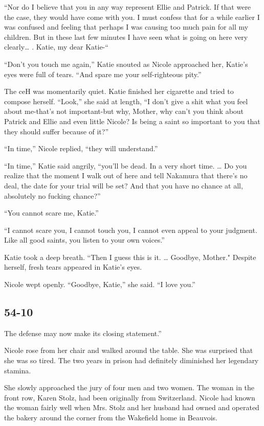 \documentclass[]{article}
\begin{document}
{{“Nor do I believe that you in any way represent Ellie and Patrick.  If that were the case, they would have come with you.  I must confess that for a while earlier I was confused and feeling that perhaps I was causing too much pain for all my children.  But in these last few minutes I have seen what is going on here very clearly… .  Katie, my dear Katie-“

“Don’t you touch me again,” Katie snouted as Nicole approached her, Katie’s eyes were full of tears.  “And spare me your self-righteous pity.”

The ceH was momentarily quiet.  Katie finished her cigarette and tried to compose herself.  “Look,” she said at length, “I don’t give a shit what you feel about me-that’s not important-but why, Mother, why can’t you think about Patrick and Ellie and even little Nicole? Is being a saint so important to you that they should suffer because of it?”

“In time,” Nicole replied, “they will understand.”

“In time,” Katie said angrily, “you’ll be dead.  In a very short time.  … Do you realize that the moment I walk out of here and tell Nakamura that there’s no deal, the date for your trial will be set? And that you have no chance at all, absolutely no fucking chance?”

“You cannot scare me, Katie.”

“I cannot scare you, I cannot touch you, I cannot even appeal to your judgment.  Like all good saints, you listen to your own voices.”

Katie took a deep breath.  “Then I guess this is it.  … Goodbye, Mother."  Despite herself, fresh tears appeared in Katie’s eyes.

Nicole wept openly.  “Goodbye, Katie,” she said.  “I love you.”


\subsection*{54-10}


The defense may now make its closing statement.”

Nicole rose from her chair and walked around the table.  She was surprised that she was so tired.  The two years in prison had definitely diminished her legendary stamina.

She slowly approached the jury of four men and two women.  The woman in the front row, Karen Stolz, had been originally from Switzerland.  Nicole had known the woman fairly well when Mrs.  Stolz and her husband had owned and operated the bakery around the corner from the Wakefield home in Beauvois.

}}
\end{document}
